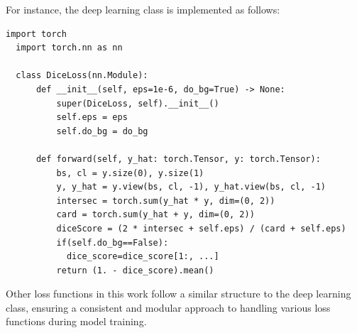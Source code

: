For instance, the deep learning class is implemented as follows:
\begin{lstlisting}[style=mystyle, caption={Implementation of the Dice Loss function for semantic segmentation tasks, inheriting from PyTorch's \texttt{nn.Module} class. The function calculates the loss based on predicted and ground truth tensors. The tensors are reshaped, and the intersection and cardinality of the predictions and ground truth are calculated. The dice score is computed, and the loss is returned as the mean of 1-\ac{DSC}. The implementation allows including or excluding the background class in the loss calculation, providing flexibility for various segmentation scenarios. The required dependencies are \texttt{torch} and \texttt{torch.nn}.}]
  import torch
  import torch.nn as nn
  
  class DiceLoss(nn.Module):
      def __init__(self, eps=1e-6, do_bg=True) -> None:
          super(DiceLoss, self).__init__()
          self.eps = eps
          self.do_bg = do_bg
  
      def forward(self, y_hat: torch.Tensor, y: torch.Tensor):
          bs, cl = y.size(0), y.size(1)
          y, y_hat = y.view(bs, cl, -1), y_hat.view(bs, cl, -1)
          intersec = torch.sum(y_hat * y, dim=(0, 2))
          card = torch.sum(y_hat + y, dim=(0, 2))
          diceScore = (2 * intersec + self.eps) / (card + self.eps)
          if(self.do_bg==False):
            dice_score=dice_score[1:, ...]
          return (1. - dice_score).mean()
  \end{lstlisting}
Other loss functions in this work follow a similar structure to the deep learning class, ensuring a consistent and modular approach to handling various loss functions during model training.
